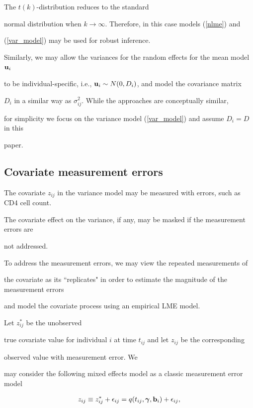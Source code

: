 \documentclass[12pt]{article}
\newcommand{\bgamma}{\mbox{\boldmath $\gamma$}}
\begin{document}
The $t(k)$-distribution reduces to the standard 

 normal distribution when $k \to \infty$. Therefore, in this case models (\ref{nlme}) and 

(\ref{var_model}) may be used for robust inference. 



   Similarly, we may allow the variances for the random effects for the mean model ${\bf u}_i$ 

to be individual-specific, i.e., ${\bf u}_i \sim N(0, D_i)$, and model the covariance matrix 

$D_i$ in a similar way as $\sigma^2_{ij}$. While the approaches are conceptually similar, 

for simplicity we focus on the variance model (\ref{var_model}) and assume $D_i=D$ in this 

paper. 



\subsection{Covariate measurement errors}



   The covariate $z_{ij}$ in the variance model may be measured with errors, such as CD4 cell count. 

The covariate effect on the variance, if any, may be masked if the measurement errors are 

not addressed. 

To address the measurement errors, we may view the repeated measurements of 

the covariate as its ``replicates" in order to estimate the magnitude of the measurement errors

and model the covariate process using an empirical LME model. 



   Let $z^*_{ij}$ be the unobserved

true covariate value for individual $i$ at time $t_{ij}$ and let $z_{ij}$ be the corresponding

observed value with measurement error. We 

may consider the following mixed effects model as a classic measurement error model 

\begin{eqnarray}

{z}_{ij} \equiv {z}^*_{ij} + \epsilon_{ij} = q(t_{ij}, \bgamma, {\bf b}_i) + \epsilon_{ij}, 

\label{CD4}

\end{eqnarray}
\end{document}
